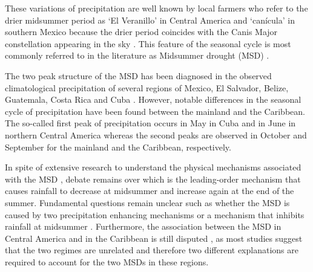 These variations of precipitation are well known by local farmers who refer to the drier midsummer period as `El Veranillo' in Central America and `can\' icula' in southern Mexico because the drier period  coincides with the Canis Major constellation appearing in the sky \citep{dilley1996}. This feature of the seasonal cycle is most commonly referred to in the literature as Midsummer drought (MSD) \citep{magana1999}. 
%

The two peak structure of the MSD has been diagnosed in the observed climatological precipitation of several regions of Mexico, El Salvador, Belize, Guatemala, Costa Rica and Cuba \citep[e.g.][]{mosino1966,magana1999,duranquesada2017,perdigon2018}.
However, notable differences in the seasonal cycle of precipitation have been found between the mainland and the Caribbean. The so-called first peak of precipitation occurs in May in Cuba and in June in northern Central America whereas the second peaks are observed in October and September for the mainland and the Caribbean, respectively. 

 In spite of extensive research to understand the physical mechanisms associated with the MSD   \citep[e.g.][]{magana1999,giannini2000,gamble2008,herrera2015,maldonado2017,straffon2019}, debate remains over which is the leading-order mechanism that causes rainfall to decrease at midsummer and increase again at the end of the summer.  %
Fundamental questions remain unclear such  as whether the MSD is caused by two precipitation enhancing mechanisms \citep{karnauskas2013} or a mechanism that inhibits rainfall at midsummer \citep{duranquesada2017}. 
Furthermore, the association between the MSD in Central America and in the Caribbean is still disputed \citep{gamble2008}, as most studies suggest that the two regimes are unrelated and therefore two different explanations are required to account for the two MSDs in these regions. 

